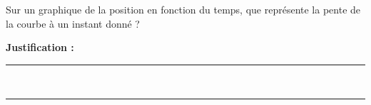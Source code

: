 Sur un graphique de la position en fonction du temps, que représente la pente de la courbe à un instant donné ?

\choices

\noindent\textbf{Justification :} \hrulefill \\[2.5ex]
\rule{\linewidth}{0.4pt} \\[2.5ex]
\rule{\linewidth}{0.4pt}
\vfill
